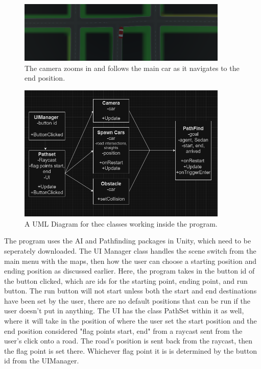 \begin{figure}[htb]
    \centering
    \includegraphics[width=10cm]{Images/Northridge2.png}
       \caption{The camera zooms in and follows the main car as it navigates to the end position.}
           \label{Fig:Game}
\end{figure}

\begin{figure}[htb]
    \centering
    \includegraphics[width=10cm]{Images/UMLClasses.png}
       \caption{A UML Diagram for thec classes working inside the program.}
           \label{Fig:UML}
\end{figure}

\begin{flushleft}
The program uses the AI and Pathfinding packages in Unity, which need to be seperately downloaded. The UI Manager class handles the scene switch from the main menu with the maps, then how the user can choose a starting position and ending position as discussed earlier. Here, the program takes in the button id of the button clicked, which are ids for the starting point, ending point, and run button. The run button will not start unless both the start and end destinations have been set by the user, there are no default positions that can be run if the user doesn't put in anything. The UI has the class PathSet within it as well, where it will take in the position of where the user set the start position and the end position considered "flag points start, end" from a raycast sent from the user's click onto a road. The road's position is sent back from the raycast, then the flag point is set there. Whichever flag point it is is determined by the button id from the UIManager.
 \end{flushleft}

